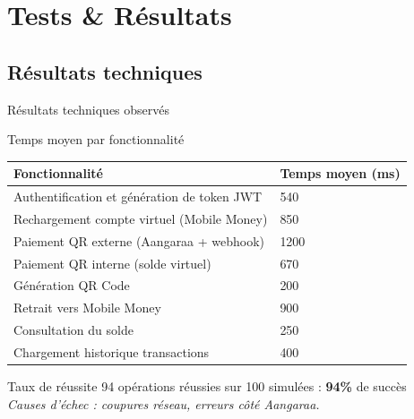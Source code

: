 \documentclass[aspectratio=169,9pt,demo]{beamer}
\begin{document}
\section{\Large Tests \& Résultats}
\subsection{\large Résultats techniques}

\begin{frame}{Résultats techniques observés}
\begin{block}{Temps moyen par fonctionnalité}
\begin{footnotesize}
\begin{tabular}{|p{6cm}|p{3cm}|}
\hline
\rowcolor{myNewColorA!40} \textbf{Fonctionnalité} & \textbf{Temps moyen (ms)} \\
\hline
Authentification et génération de token JWT & 540 \\
Rechargement compte virtuel (Mobile Money) & 850 \\
Paiement QR externe (Aangaraa + webhook) & 1200 \\
Paiement QR interne (solde virtuel) & 670 \\
Génération QR Code & 200 \\
Retrait vers Mobile Money & 900 \\
Consultation du solde & 250 \\
Chargement historique transactions & 400 \\
\hline
\end{tabular}
\end{footnotesize}
\end{block}

\begin{block}{Taux de réussite}
94 opérations réussies sur 100 simulées : \textbf{94\%} de succès \\
\textit{Causes d'échec : coupures réseau, erreurs côté Aangaraa.}
\end{block}
\end{frame}
\end{document}

